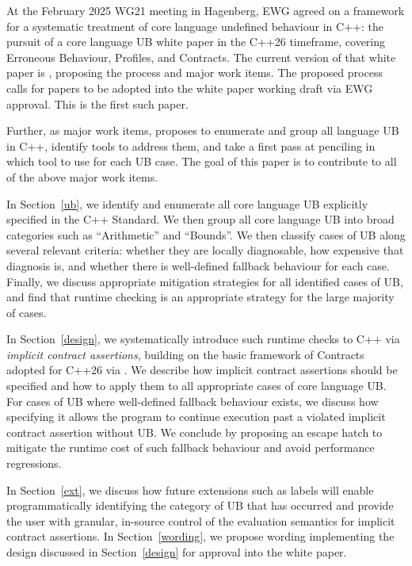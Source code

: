At the February 2025 WG21 meeting in Hagenberg, EWG agreed on a framework for a systematic
treatment of core language undefined behaviour in C++: the pursuit of a core language UB white paper in the C++26 timeframe, covering Erroneous Behaviour, Profiles, and Contracts. The current version of that white paper is \cite{P3656R1}, proposing the process and major work items. The proposed process calls for papers to be adopted into the white paper working draft via EWG approval. This is the first such paper.

Further, as major work items, \cite{P3656R1} proposes to enumerate and group all language UB in C++, identify tools to address them, and take a first pass at penciling in which tool to use for each UB case. The goal of this paper is to contribute to all of the above major work items.

In Section~\ref{ub}, we identify and enumerate all core language UB explicitly specified in the C++ Standard. We then group all core language UB into broad categories such as ``Arithmetic'' and ``Bounds''. We then classify cases of UB along several relevant criteria: whether they are locally diagnosable, how expensive that diagnosis is, and whether there is well-defined fallback behaviour for each case. Finally, we discuss appropriate mitigation strategies for all identified cases of UB, and find that runtime checking is an appropriate strategy for the large majority of cases.

In Section~\ref{design}, we systematically introduce such runtime checks to C++ via  \emph{implicit contract assertions}, building on the basic framework of Contracts adopted for C++26 via \cite{P2900R14}. We describe how implicit contract assertions should be specified and how to apply them to all appropriate cases of core language UB. For cases of UB where well-defined fallback behaviour exists, we discuss how specifying it allows the program to continue execution past a violated implicit contract assertion without UB. We conclude by proposing an escape hatch to mitigate the runtime cost of such fallback behaviour and avoid performance regressions.

In Section~\ref{ext}, we discuss how future extensions such as labels \cite{P3400R1} will enable programmatically identifying the category of UB that has occurred and provide the user with granular, in-source control of the evaluation semantics for implicit contract assertions. In Section~\ref{wording}, we propose wording implementing the design discussed in Section~\ref{design} for approval into the white paper.

